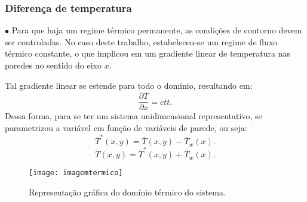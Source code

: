 \documentclass[xcolor=dvipsnames,10pt,aspectratio=169]{beamer}
\begin{document}
		\begin{frame}
			\frametitle{Diferença de temperatura}
			$\bullet$ Para que haja um regime térmico permanente, as condições de contorno devem ser controladas. No caso deste trabalho, estabeleceu-se um regime de fluxo térmico constante, o que implicou em um gradiente linear de temperatura nas paredes no sentido do eixo $x$.  \\
			\begin{minipage}[h!]{0.36\textwidth}
				Tal gradiente linear se estende para todo o domínio, resultando em:
				\begin{equation}
				\frac{\partial \overline{T}}{\partial x} = ctt.
				\end{equation}
				Dessa forma, para se ter um sistema unidimensional representativo, se parametrizou a variável em função de variáveis de parede, ou seja:
				\begin{equation}
				\overline{T}^\ast(x , y) = \overline{T}(x,y)  - \overline{T}_w(x) .
				\end{equation}
				\begin{equation}
				\overline{T}(x,y) = \overline{T}^\ast(x , y) + \overline{T}_w(x).
				\end{equation}
			\end{minipage}\hfill
			\begin{minipage}[h!]{0.60\textwidth}
			\begin{figure}
				\centering
				\texttt{[image: imagemtermico]}
				\caption{Representação gráfica do domínio térmico do sistema.}
				\label{temperatura}
			\end{figure}
			\end{minipage}
		\end{frame}
		
		
		
		
		
\end{document}
